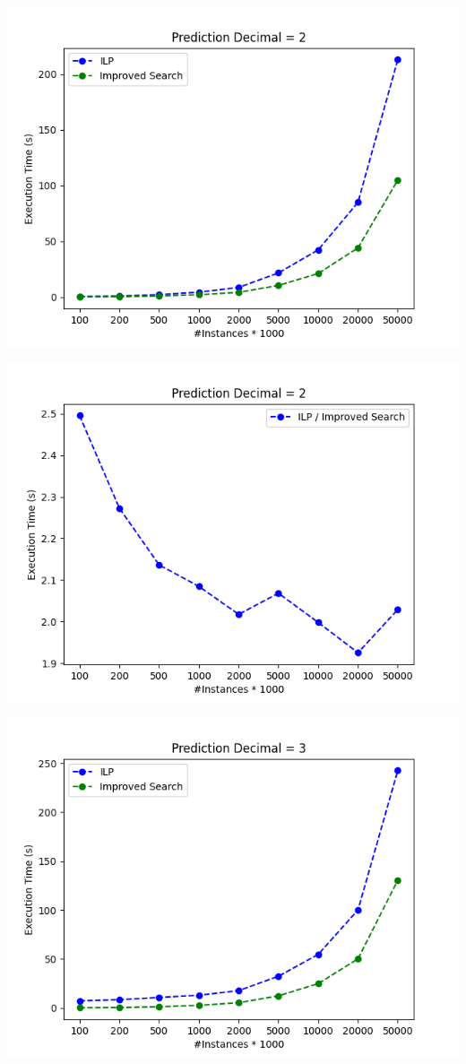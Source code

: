 \documentclass[a4paper]{article}
\begin{document}
\begin{center}
	\includegraphics[]{figure_6}
\end{center}

\begin{center}
	\includegraphics[]{figure_6_temp}
\end{center}

\begin{center}
	\includegraphics[]{figure_4}
\end{center}
\end{document}
